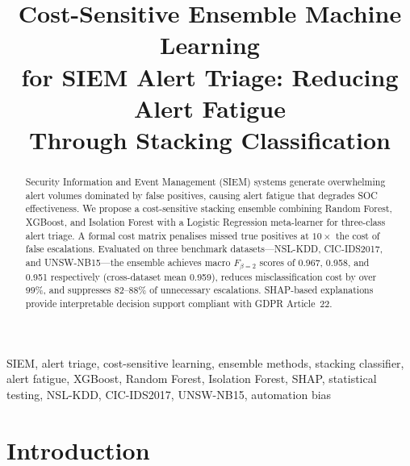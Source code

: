 \documentclass[conference]{IEEEtran}
\begin{document}
\title{Cost-Sensitive Ensemble Machine Learning\\for SIEM Alert Triage: Reducing Alert Fatigue\\Through Stacking Classification}

\author{
}

\maketitle

\begin{abstract}
Security Information and Event Management (SIEM) systems generate overwhelming alert volumes dominated by false positives, causing alert fatigue that degrades SOC effectiveness. We propose a cost-sensitive stacking ensemble combining Random Forest, XGBoost, and Isolation Forest with a Logistic Regression meta-learner for three-class alert triage. A formal cost matrix penalises missed true positives at $10\times$ the cost of false escalations. Evaluated on three benchmark datasets---NSL-KDD, CIC-IDS2017, and UNSW-NB15---the ensemble achieves macro $F_{\beta=2}$ scores of 0.967, 0.958, and 0.951 respectively (cross-dataset mean 0.959), reduces misclassification cost by over 99\%, and suppresses 82--88\% of unnecessary escalations. SHAP-based explanations provide interpretable decision support compliant with GDPR Article~22.
\end{abstract}

\begin{IEEEkeywords}
SIEM, alert triage, cost-sensitive learning, ensemble methods, stacking classifier,
alert fatigue, XGBoost, Random Forest, Isolation Forest, SHAP, statistical testing,
NSL-KDD, CIC-IDS2017, UNSW-NB15, automation bias
\end{IEEEkeywords}

\section{Introduction}
\label{sec:introduction}
\end{document}
